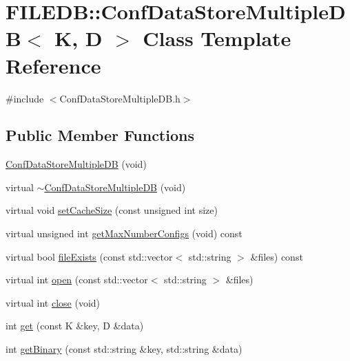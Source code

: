 \hypertarget{classFILEDB_1_1ConfDataStoreMultipleDB}{}\section{F\+I\+L\+E\+DB\+:\+:Conf\+Data\+Store\+Multiple\+DB$<$ K, D $>$ Class Template Reference}
\label{classFILEDB_1_1ConfDataStoreMultipleDB}


{\ttfamily \#include $<$Conf\+Data\+Store\+Multiple\+D\+B.\+h$>$}

\subsection*{Public Member Functions}
\begin{DoxyCompactItemize}
\item 
\mbox{\hyperlink{classFILEDB_1_1ConfDataStoreMultipleDB_a90ff1c27ea7415ba0d874df53fd0b955}{Conf\+Data\+Store\+Multiple\+DB}} (void)
\item 
virtual \mbox{\hyperlink{classFILEDB_1_1ConfDataStoreMultipleDB_a8025977163f25ad73764a794d0c89271}{$\sim$\+Conf\+Data\+Store\+Multiple\+DB}} (void)
\item 
virtual void \mbox{\hyperlink{classFILEDB_1_1ConfDataStoreMultipleDB_a37115269cf1f8f04c49ab888b040fa13}{set\+Cache\+Size}} (const unsigned int size)
\item 
virtual unsigned int \mbox{\hyperlink{classFILEDB_1_1ConfDataStoreMultipleDB_adb7a350dc85ad9c3830e98a0f03b68d7}{get\+Max\+Number\+Configs}} (void) const
\item 
virtual bool \mbox{\hyperlink{classFILEDB_1_1ConfDataStoreMultipleDB_a85c71818db3a3b0a5a67b4dabaed2ff7}{file\+Exists}} (const std\+::vector$<$ std\+::string $>$ \&files) const
\item 
virtual int \mbox{\hyperlink{classFILEDB_1_1ConfDataStoreMultipleDB_a3370c2f938d91e2352815aa45637b46d}{open}} (const std\+::vector$<$ std\+::string $>$ \&files)
\item 
virtual int \mbox{\hyperlink{classFILEDB_1_1ConfDataStoreMultipleDB_a6ab94d980290baa33292b7ec54bfe637}{close}} (void)
\item 
int \mbox{\hyperlink{classFILEDB_1_1ConfDataStoreMultipleDB_a15c985c05120d6076e890f0507ceade7}{get}} (const K \&key, D \&data)
\item 
int \mbox{\hyperlink{classFILEDB_1_1ConfDataStoreMultipleDB_a56fefab208c1b4abc3139afb38035a13}{get\+Binary}} (const std\+::string \&key, std\+::string \&data)

\end{DoxyCompactItemize}
